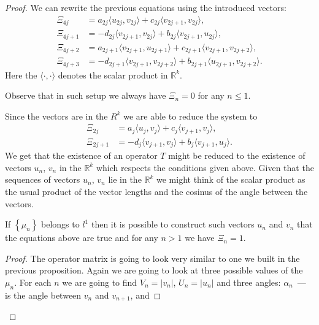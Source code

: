\documentclass[12pt]{amsart}
\theoremstyle{case}
\begin{document}
\begin{proof}
      We can rewrite the previous equations using the introduced vectors:
      \begin{align*}
          \Xi_{4j} &= a_{2j} \langle u_{2j}, v_{2j}\rangle + c_{2j} \langle v_{2j+1}, v_{2j}\rangle,\\
          \Xi_{4j + 1} &= -d_{2j} \langle v_{2j+1}, v_{2j}\rangle + b_{2j} \langle v_{2j+1}, u_{2j}\rangle,\\
          \Xi_{4j + 2} &= a_{2j+1} \langle v_{2j+1}, u_{2j+1} \rangle + c_{2j+1} \langle v_{2j+1}, v_{2j+2} \rangle,\\
          \Xi_{4j + 3} &= -d_{2j+1} \langle v_{2j+1}, v_{2j+2}\rangle + b_{2j+1} \langle u_{2j+1}, v_{2j+2} \rangle.
      \end{align*}
      Here the $\langle\cdot, \cdot\rangle$ denotes the scalar product in $\mathbb{R}^k$.
      \begin{note}
        Observe that in such setup we always have $\Xi_n = 0$ for any $n \leq 1$.
      \end{note}
      Since the vectors are in the $R^k$ we are able to reduce the system to
      \begin{align*}
        \Xi_{2j} &= a_{j} \langle u_{j}, v_{j} \rangle  + c_{j} \langle v_{j+1}, v_{j} \rangle,\\
        \Xi_{2j + 1} &= -d_{j} \langle v_{j+1}, v_{j} \rangle + b_{j} \langle v_{j+1}, u_{j}\rangle.
      \end{align*}
      We get that the existence of an operator $T$ might be reduced to the existence of vectors $u_n$, $v_n$ in the $\mathbb{R}^k$
        which respects the conditions given above.
      Given that the sequences of vectors $u_n$, $v_n$ lie in the $\mathbb{R}^k$ we might think of the scalar product as
        the usual product of the vector lengths and the cosinus of the angle between the vectors.
      \begin{prop}
          \label{k-dim-statement}
          If $\left\{\mu_n\right\}$ belongs to $l^1$ then it is possible to construct such vectors $u_n$ and $v_n$ that the equations above are true and for any $n > 1$ we have $\Xi_n = 1$.
      \end{prop}
      \begin{proof}
          The operator matrix is going to look very similar to one we built in the previous proposition.
          Again we are going to look at three possible values of the $\mu_n$.
          For each $n$ we are going to find $V_n = |v_n|$, $U_n = |u_n|$ and three angles:
          $\alpha_n$~--- is the angle between $v_n$ and $v_{n + 1}$, and

\end{proof}
\end{proof}
\end{document}
